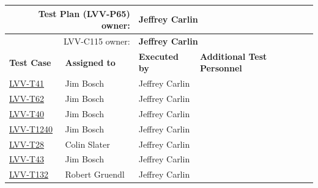 \documentclass[DM,lsstdraft,STR,toc]{lsstdoc}
\begin{document}
\begin{longtable}{p{3cm}p{3cm}p{3cm}p{6cm}}
\hline
\multicolumn{2}{r}{Test Plan (LVV-P65) owner:} &
\multicolumn{2}{l}{\textbf{ Jeffrey Carlin } }\\\hline
\multicolumn{2}{r}{ LVV-C115 owner:} &
\multicolumn{2}{l}{\textbf{
    Jeffrey Carlin
}
} \\\hline
\textbf{Test Case} & \textbf{Assigned to} & \textbf{Executed by} & \textbf{Additional Test Personnel} \\ \hline
\href{https://jira.lsstcorp.org/secure/Tests.jspa#/testCase/LVV-T41}{LVV-T41}
& {\small Jim Bosch } & {\small Jeffrey Carlin } &
\begin{minipage}[]{6cm}
\smallskip
{\small  }
\medskip
\end{minipage}
\\ \hline
\href{https://jira.lsstcorp.org/secure/Tests.jspa#/testCase/LVV-T62}{LVV-T62}
& {\small Jim Bosch } & {\small Jeffrey Carlin } &
\begin{minipage}[]{6cm}
\smallskip
{\small  }
\medskip
\end{minipage}
\\ \hline
\href{https://jira.lsstcorp.org/secure/Tests.jspa#/testCase/LVV-T40}{LVV-T40}
& {\small Jim Bosch } & {\small Jeffrey Carlin } &
\begin{minipage}[]{6cm}
\smallskip
{\small  }
\medskip
\end{minipage}
\\ \hline
\href{https://jira.lsstcorp.org/secure/Tests.jspa#/testCase/LVV-T1240}{LVV-T1240}
& {\small Jim Bosch } & {\small Jeffrey Carlin } &
\begin{minipage}[]{6cm}
\smallskip
{\small  }
\medskip
\end{minipage}
\\ \hline
\href{https://jira.lsstcorp.org/secure/Tests.jspa#/testCase/LVV-T28}{LVV-T28}
& {\small Colin Slater } & {\small Jeffrey Carlin } &
\begin{minipage}[]{6cm}
\smallskip
{\small  }
\medskip
\end{minipage}
\\ \hline
\href{https://jira.lsstcorp.org/secure/Tests.jspa#/testCase/LVV-T43}{LVV-T43}
& {\small Jim Bosch } & {\small Jeffrey Carlin } &
\begin{minipage}[]{6cm}
\smallskip
{\small  }
\medskip
\end{minipage}
\\ \hline
\href{https://jira.lsstcorp.org/secure/Tests.jspa#/testCase/LVV-T132}{LVV-T132}
& {\small Robert Gruendl } & {\small Jeffrey Carlin } &

\end{longtable}
\end{document}
